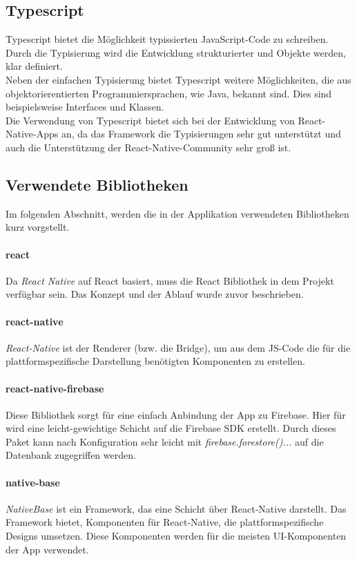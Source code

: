 \subsection{Typescript}
Typescript bietet die Möglichkeit typissierten JavaScript-Code zu schreiben.
Durch die Typisierung wird die Entwicklung strukturierter und Objekte werden,
klar definiert. \\
Neben der einfachen Typisierung bietet Typescript weitere Möglichkeiten, die aus
objektorierentierten Programmiersprachen, wie Java, bekannt sind. Dies sind beispielsweise
Interfaces und Klassen. \\
Die Verwendung von Typescript bietet sich bei der Entwicklung von React-Native-Apps an,
da das Framework die Typisierungen sehr gut unterstützt und auch die Unterstützung der React-Native-Community sehr groß ist. \cite{TypescriptReasons:online}

\subsection{Verwendete Bibliotheken}
Im folgenden Abschnitt, werden die in der Applikation verwendeten Bibliotheken kurz vorgstellt.

\paragraph{react}
Da \textit{React Native} auf React basiert, muss die React Bibliothek
in dem Projekt verfügbar sein. Das Konzept und der Ablauf wurde zuvor beschrieben. \cite{React:online}

\paragraph{react-native}
\textit{React-Native} ist der Renderer (bzw. die Bridge), um aus dem JS-Code
die für die plattformspezifische Darstellung benötigten Komponenten zu erstellen.
\cite{ReactNative:online}

\paragraph{react-native-firebase}
Diese Bibliothek sorgt für eine einfach Anbindung der App zu Firebase. Hier für wird eine leicht-gewichtige
Schicht auf die Firebase SDK erstellt. Durch dieses Paket kann nach Konfiguration sehr leicht mit \textit{firebase.forestore()...} auf die 
Datenbank zugegriffen werden.
\cite{invertas78:online}

\paragraph{native-base}
\textit{NativeBase} ist ein Framework, das eine Schicht über React-Native darstellt. Das Framework bietet,
Komponenten für React-Native, die plattformspezifische Designs umsetzen. Diese Komponenten werden für die meisten UI-Komponenten der App
verwendet. \cite{NativeBase:online}

